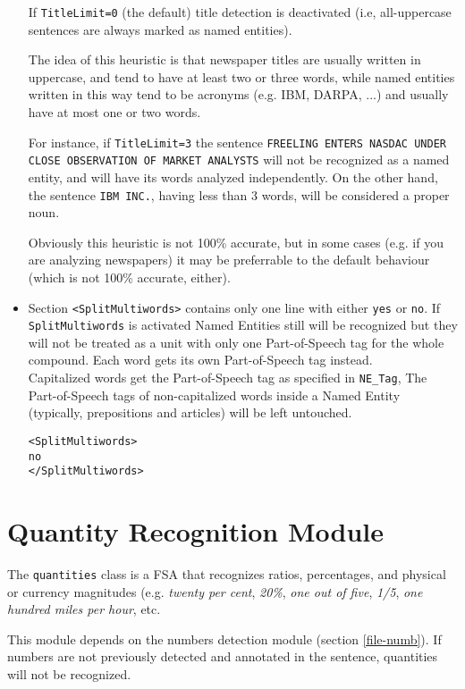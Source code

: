 \documentclass[a4paper]{book}
\begin{document}
\begin{itemize}
  If \verb#TitleLimit=0# (the default) title detection is
  deactivated (i.e, all-uppercase sentences are always marked as
  named entities).

  The idea of this heuristic is that newspaper titles are usually
  written in uppercase, and tend to have at least two or three
  words, while named entities written in this way tend to be acronyms
  (e.g. IBM, DARPA, ...) and usually have at most one or two words.

  For instance, if \verb#TitleLimit=3# the sentence 
  {\tt FREELING ENTERS NASDAC UNDER CLOSE OB\-SER\-VA\-TION OF MARKET ANALYSTS}
  will not be recognized as a named entity, and will have its words analyzed
  independently. On the other hand, the sentence {\tt IBM INC.}, having less than
  3 words, will be considered a proper noun.

  Obviously this heuristic is not 100\% accurate, but in some cases
  (e.g. if you are analyzing newspapers) it may be preferrable to the
  default behaviour (which is not 100\% accurate, either).
  
  \item Section \verb#<SplitMultiwords># contains only one line with
    either \verb#yes# or \verb#no#. If \verb#SplitMultiwords# is
    activated Named Entities still will be recognized but they will
    not be treated as a unit with only one Part-of-Speech tag for the
    whole compound. Each word gets its own Part-of-Speech tag
    instead.\\ Capitalized words get the Part-of-Speech tag as
    specified in \verb#NE_Tag#, The Part-of-Speech tags of
    non-capitalized words inside a Named Entity (typically,
    prepositions and articles) will be left untouched.
\begin{verbatim}
<SplitMultiwords>
no
</SplitMultiwords>
\end{verbatim}
\end{itemize}


\section{Quantity Recognition Module}
\label{file-quant}

  The {\tt quantities} class is a FSA that recognizes ratios,
  percentages, and physical or currency magnitudes (e.g. {\em twenty
    per cent}, {\em 20\%}, {\em one out of five}, {\em 1/5}, {\em one
    hundred miles per hour}, etc.

  This module depends on the numbers detection module (section
  \ref{file-numb}). If numbers are not previously detected and
  annotated in the sentence, quantities will not be recognized.
\end{document}
